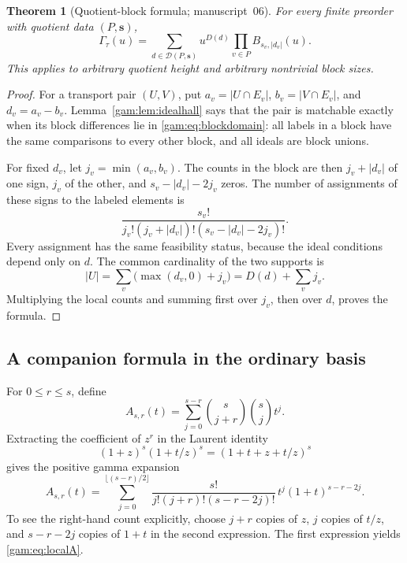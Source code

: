 \documentclass[11pt]{article}
\numberwithin{equation}{section}
\newtheorem{theorem}{Theorem}[section]
\theoremstyle{definition}
\begin{document}
\begin{theorem}[Quotient-block formula; manuscript~06]\label{gam:thm:blocks}
For every finite preorder with quotient data $(P,\mathbf s)$,
\begin{equation}
 \boxed{\displaystyle
 \Gamma_\tau(u)=\sum_{d\in\mathcal D(P,\mathbf s)}
                   u^{D(d)}\prod_{v\in P}B_{s_v,|d_v|}(u).}
 \label{gam:eq:blocks}
\end{equation}
This applies to arbitrary quotient height and arbitrary nontrivial block
sizes.
\end{theorem}
\begin{proof}
For a transport pair $(U,V)$, put
$a_v=|U\cap E_v|$, $b_v=|V\cap E_v|$, and $d_v=a_v-b_v$.
Lemma~\ref{gam:lem:idealhall} says that the pair is matchable exactly when its
block differences lie in \eqref{gam:eq:blockdomain}: all labels in a block have
the same comparisons to every other block, and all ideals are block unions.

For fixed $d_v$, let $j_v=\min(a_v,b_v)$. The counts in the block are then
$j_v+|d_v|$ of one sign, $j_v$ of the other, and
$s_v-|d_v|-2j_v$ zeros. The number of assignments of these signs to the
labeled elements is
\[
 \frac{s_v!}{j_v!(j_v+|d_v|)!(s_v-|d_v|-2j_v)!}.
\]
Every assignment has the same feasibility status, because the ideal
conditions depend only on $d$. The common cardinality of the two supports is
\[
 |U|=\sum_v\bigl(\max(d_v,0)+j_v\bigr)=D(d)+\sum_vj_v.
\]
Multiplying the local counts and summing first over $j_v$, then over $d$,
proves the formula.
\end{proof}

\subsection{A companion formula in the ordinary basis}
For $0\le r\le s$, define
\begin{equation}
 A_{s,r}(t)=\sum_{j=0}^{s-r}\binom{s}{j+r}\binom{s}{j}t^j.
 \label{gam:eq:localA}
\end{equation}
Extracting the coefficient of $z^r$ in the Laurent identity
\[
 (1+z)^s(1+t/z)^s=(1+t+z+t/z)^s
\]
gives the positive gamma expansion
\begin{equation}
 A_{s,r}(t)=\sum_{j=0}^{\lfloor(s-r)/2\rfloor}
       \frac{s!}{j!(j+r)!(s-r-2j)!}\,t^j(1+t)^{s-r-2j}.
 \label{gam:eq:Aexpand}
\end{equation}
To see the right-hand count explicitly, choose $j+r$ copies of $z$, $j$
copies of $t/z$, and $s-r-2j$ copies of $1+t$ in the second expression.
The first expression yields \eqref{gam:eq:localA}.
\end{document}
